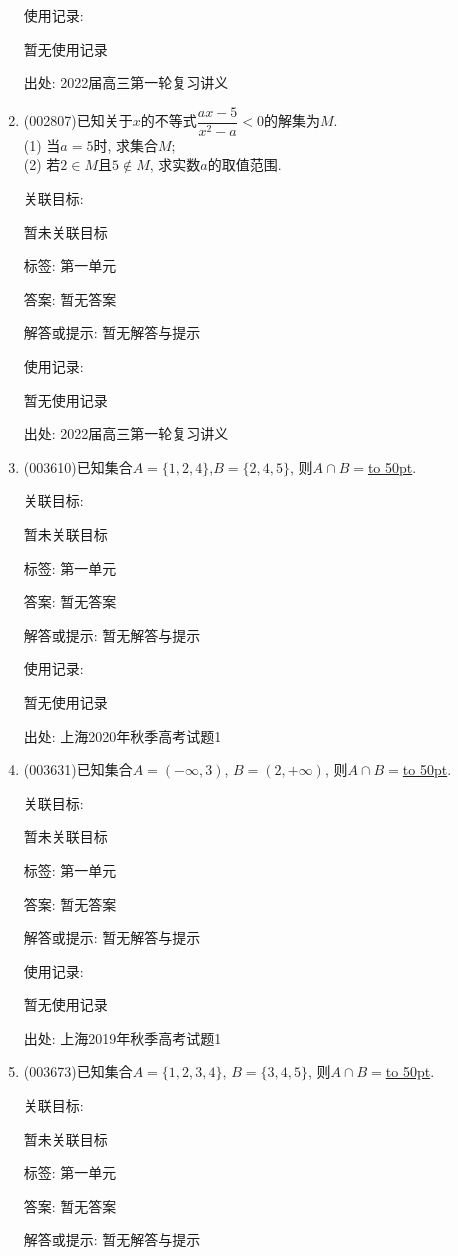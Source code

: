 \documentclass[10pt,a4paper]{article}
\newcommand{\blank}[1]{\underline{\hbox to #1pt{}}}
\begin{document}
\begin{enumerate}[1.]
使用记录:

暂无使用记录


出处: 2022届高三第一轮复习讲义
\item { (002807)}已知关于$x$的不等式$\dfrac{ax-5}{x^2-a}<0$的解集为$M$.\\
(1) 当$a=5$时, 求集合$M$;\\
(2) 若$2\in M$且$5\notin M$, 求实数$a$的取值范围.


关联目标:

暂未关联目标



标签: 第一单元

答案: 暂无答案

解答或提示: 暂无解答与提示

使用记录:

暂无使用记录


出处: 2022届高三第一轮复习讲义
\item { (003610)}已知集合$A=\{1,2,4\}$,$B=\{2,4,5\}$, 则$A\cap B=$\blank{50}.


关联目标:

暂未关联目标



标签: 第一单元

答案: 暂无答案

解答或提示: 暂无解答与提示

使用记录:

暂无使用记录


出处: 上海2020年秋季高考试题1
\item { (003631)}已知集合$A=(-\infty,3)$, $B=(2,+\infty)$, 则$A\cap B=$\blank{50}.


关联目标:

暂未关联目标



标签: 第一单元

答案: 暂无答案

解答或提示: 暂无解答与提示

使用记录:

暂无使用记录


出处: 上海2019年秋季高考试题1
\item { (003673)}已知集合$A=\{1,2,3,4\}$, $B=\{3,4,5\}$, 则$A\cap B=$\blank{50}.


关联目标:

暂未关联目标



标签: 第一单元

答案: 暂无答案

解答或提示: 暂无解答与提示


\end{enumerate}
\end{document}
